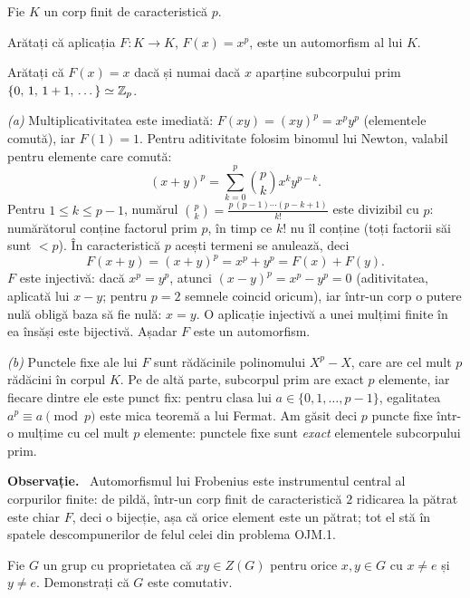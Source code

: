 \begin{problema}[Clasică]
Fie $K$ un corp finit de caracteristică $p$.
\begin{parti}
\item Arătați că aplicația $F : K \to K$, $F(x) = x^p$, este un automorfism al lui $K$.
\item Arătați că $F(x) = x$ dacă și numai dacă $x$ aparține subcorpului prim $\{0,\, 1,\, 1+1,\, \dots\} \simeq \mathbb{Z}_p$.
\end{parti}
\end{problema}

\begin{solutie}
\emph{(a)} Multiplicativitatea este imediată: $F(xy) = (xy)^p = x^p y^p$ (elementele comută), iar $F(1) = 1$. Pentru aditivitate folosim binomul lui Newton, valabil pentru elemente care comută:
\[
(x+y)^p = \sum_{k=0}^{p} \binom{p}{k} x^k y^{p-k}.
\]
Pentru $1 \leq k \leq p-1$, numărul $\binom{p}{k} = \frac{p\,(p-1)\cdots(p-k+1)}{k!}$ este divizibil cu $p$: numărătorul conține factorul prim $p$, în timp ce $k!$ nu îl conține (toți factorii săi sunt $< p$). În caracteristică $p$ acești termeni se anulează, deci
\[
F(x+y) = (x+y)^p = x^p + y^p = F(x) + F(y).
\]
$F$ este injectivă: dacă $x^p = y^p$, atunci $(x-y)^p = x^p - y^p = 0$ (aditivitatea, aplicată lui $x-y$; pentru $p = 2$ semnele coincid oricum), iar într-un corp o putere nulă obligă baza să fie nulă: $x = y$. O aplicație injectivă a unei mulțimi finite în ea însăși este bijectivă. Așadar $F$ este un automorfism.

\emph{(b)} Punctele fixe ale lui $F$ sunt rădăcinile polinomului $X^p - X$, care are cel mult $p$ rădăcini în corpul $K$. Pe de altă parte, subcorpul prim are exact $p$ elemente, iar fiecare dintre ele este punct fix: pentru clasa lui $a \in \{0, 1, \dots, p-1\}$, egalitatea $a^p \equiv a \pmod p$ este mica teoremă a lui Fermat. Am găsit deci $p$ puncte fixe într-o mulțime cu cel mult $p$ elemente: punctele fixe sunt \emph{exact} elementele subcorpului prim.

\medskip
\noindent\textbf{Observație.} \ Automorfismul lui Frobenius este instrumentul central al corpurilor finite: de pildă, într-un corp finit de caracteristică $2$ ridicarea la pătrat este chiar $F$, deci o bijecție, așa că orice element este un pătrat; tot el stă în spatele descompunerilor de felul celei din problema OJM.1.
\end{solutie}

\begin{problema}
Fie $G$ un grup cu proprietatea că $xy \in Z(G)$ pentru orice
$x,y\in G$ cu $x\neq e$ și $y\neq e$. Demonstrați că $G$ este
comutativ.
\end{problema}

